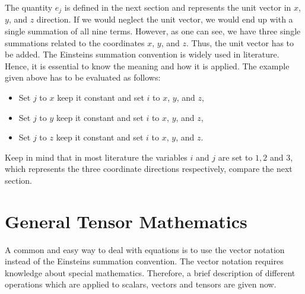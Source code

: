 \documentclass[MathematicsNumericsDerivationsAndOpenFOAM.tex]{subfiles}
\begin{document}
%
%
    The quantity $e_j$ is defined in the next section and represents the unit
    vector in $x$, $y$, and $z$ direction. If we would neglect the unit vector,
    we would end up with a single summation of all nine terms. However, as one can
    see, we have three single summations related to the coordinates $x$, $y$,
    and $z$. Thus, the unit vector has to be added.
    The Einsteins summation convention is widely used in literature.
    Hence, it is essential to know the meaning and how it is applied. The
    example given above has to be evaluated as follows:
%
%
\begin{itemize}
    \item Set $j$ to $x$ keep it constant and set $i$ to $x$, $y$, and $z$,
    \item Set $j$ to $y$ keep it constant and set $i$ to $x$, $y$, and $z$,
    \item Set $j$ to $z$ keep it constant and set $i$ to $x$, $y$, and $z$.
\end{itemize}
%
%
    Keep in mind that in most literature the variables $i$ and $j$ are set to
    $1, 2$ and $3$, which represents the three coordinate directions
    respectively, compare the next section.
%
%
\section{General Tensor Mathematics}
%
%
	A common and easy way to deal with equations is to use the vector notation
    instead of the Einsteins summation convention. The vector notation requires
    knowledge about special mathematics. Therefore, a brief description of
    different operations which are applied to scalars, vectors and tensors
    are given now.
\end{document}

